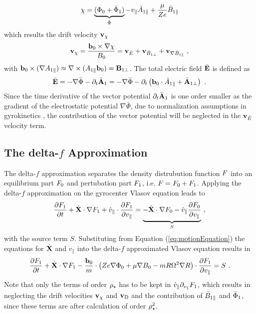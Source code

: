 \begin{gather}
	\chi = \underbrace{(\Phi_0 + \bar{\Phi}_1)}_{\bar{\Phi}} - v_\parallel \bar{A}_{1\parallel} + \frac{\mu}{Ze} \bar{B}_{1\parallel}
	\label{eq:driftPotential}
\end{gather}
which results the drift velocity $\boldsymbol{\mathbf{v}}_\chi$ 
\begin{gather}
	\boldsymbol{\mathbf{v}}_\chi = \frac{\boldsymbol{\mathbf{b}}_0 \times \nabla \chi}{B_0} = \boldsymbol{\mathbf{v}}_{\bar{E}} + \boldsymbol{\mathbf{v}}_{\bar{B}_{1\perp}} + \boldsymbol{\mathbf{v}}_{\nabla \bar{B}_{1\parallel}}~,
	\label{eq:veloDriftPotential}
\end{gather}
with $\boldsymbol{\mathbf{b}}_0 \times (\nabla A_{1\parallel}) \approx \nabla \times (A_{1\parallel} \boldsymbol{\mathbf{b}}_0) = \boldsymbol{\mathbf{B}}_{1\perp}$. The total electric field $\bar{\boldsymbol{\mathbf{E}}}$ is defined as 
\begin{gather}
	\bar{\boldsymbol{\mathbf{E}}} = - \nabla \bar{\Phi} - \partial_t \bar{\boldsymbol{\mathbf{A}}}_1 = - \nabla \bar{\Phi} - \partial_t \left(\boldsymbol{\mathbf{b}}_0 \cdot \bar{A}_{1\parallel} + \bar{\boldsymbol{\mathbf{A}}}_{1\perp} \right)  ~.
	\label{eq:totalElectricField}
\end{gather}
Since the time derivative of the vector potential $\partial_t \bar{\boldsymbol{\mathbf{A}}}_1$ is one order smaller as the gradient of the electrostatic potential $\nabla \bar{\Phi}$, due to normalization assumptions in gyrokinetics \cite{Peeters2009A}, the contribution of the vector potential will be neglected in the $\boldsymbol{\mathbf{v}}_{\bar{E}}$ velocity term.

\newpage

\subsection{The delta-\!$f$ Approximation}
\label{sub:approximation}

The delta-\!$f$ approximation separates the density distrubution function $F$ into an equilibrium part $F_0$ and pertubation part $F_1$, i.e. $F = F_0 + F_1$. Applying the delta-\!$f$ approximation on the gyrocenter Vlasov equation leads to
\begin{gather}
	\frac{\partial F_1}{\partial t} + \dot{\boldsymbol{\mathbf{X}}} \cdot \nabla F_1 + \dot{v}_\parallel \cdot \frac{\partial F_1}{\partial v_\parallel} = \underbrace{- \dot{\boldsymbol{\mathbf{X}}} \cdot \nabla F_0 - \dot{v}_\parallel \frac{\partial F_0}{\partial v_\parallel}}_S~,
	\label{eq:gyrocenterDeltafVlasov}
\end{gather}
with the source term $S$. Substituting from Equation (\ref{eq:motionEquation}) the equations for $\dot{\boldsymbol{\mathbf{X}}}$ and $\dot{v}_\parallel$ into the delta-$f$ approximated Vlasov equation results in
\begin{gather}
	\frac{\partial F_1}{\partial t} + \dot{\boldsymbol{\mathbf{X}}} \cdot \nabla F_1 - \frac{\boldsymbol{\mathbf{b}}_0}{m} \cdot \left(Ze\nabla \Phi_0 + \mu \nabla B_0 - mR \Omega^2 \nabla R \right) \cdot \frac{\partial F_1}{\partial v_\parallel} = S~.
	\label{eq:gyrocenterDeltafSubVlasov}
\end{gather}
Note that only the terms of order $\rho_\star$ has to be kept in $\dot{v}_\parallel \partial_{v_\parallel} F_1$, which results in neglecting the drift velocities $\boldsymbol{\mathbf{v}}_\chi$ and $\boldsymbol{\mathbf{v}}_\mathrm{D}$ and the contribution of $\bar{B}_{1\parallel}$ and $\bar{\Phi}_1$, since these terms are after calculation of order $\rho_\star^2$. \bigskip


